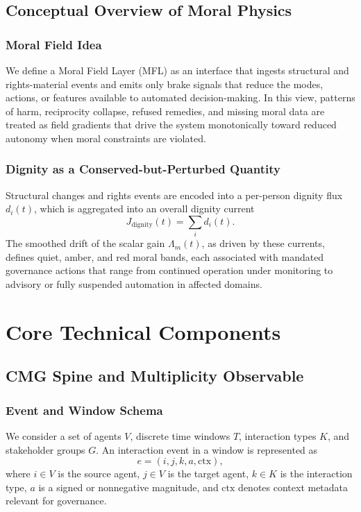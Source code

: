 \documentclass[11pt]{article}
\begin{document}
\subsection{Conceptual Overview of Moral Physics}

\subsubsection{Moral Field Idea}

We define a Moral Field Layer (MFL) as an interface that ingests structural and rights-material events and emits only brake signals that reduce the modes, actions, or features available to automated decision-making. In this view, patterns of harm, reciprocity collapse, refused remedies, and missing moral data are treated as field gradients that drive the system monotonically toward reduced autonomy when moral constraints are violated.

\subsubsection{Dignity as a Conserved-but-Perturbed Quantity}

Structural changes and rights events are encoded into a per-person dignity flux \(d_i(t)\), which is aggregated into an overall dignity current
\[
J_{\mathrm{dignity}}(t) = \sum_i d_i(t).
\]
The smoothed drift of the scalar gain \(\Lambda_m(t)\), as driven by these currents, defines quiet, amber, and red moral bands, each associated with mandated governance actions that range from continued operation under monitoring to advisory or fully suspended automation in affected domains.

\section{Core Technical Components}

\subsection{CMG Spine and Multiplicity Observable}

\subsubsection{Event and Window Schema}

We consider a set of agents \(V\), discrete time windows \(T\), interaction types \(K\), and stakeholder groups \(G\). An interaction event in a window is represented as
\[
e = (i, j, k, a, \mathrm{ctx}),
\]
where \(i \in V\) is the source agent, \(j \in V\) is the target agent, \(k \in K\) is the interaction type, \(a\) is a signed or nonnegative magnitude, and \(\mathrm{ctx}\) denotes context metadata relevant for governance.
\end{document}
